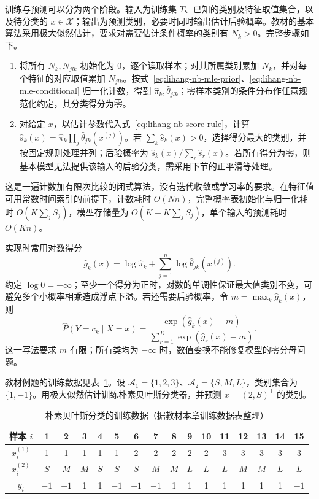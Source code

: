 训练与预测可以分为两个阶段。输入为训练集 $T$、已知的类别及特征取值集合，以及待分类的 $x\in\mathcal{X}$；输出为预测类别，必要时同时输出估计后验概率。教材的基本算法采用极大似然估计，要求对需要估计条件概率的类别有 $N_k>0$。完整步骤如下。
\begin{enumerate}
    \item 将所有 $N_k,N_{jlk}$ 初始化为 $0$，逐个读取样本；对其所属类别累加 $N_k$，并对每个特征的对应取值累加 $N_{jlk}$。按式~\eqref{eq:lihang-nb-mle-prior}、\eqref{eq:lihang-nb-mle-conditional} 归一化计数，得到 $\widehat\pi_k,\widehat\theta_{jlk}$；零样本类别的条件分布作任意规范化约定，其分类得分为零。
    \item 对给定 $x$，以估计参数代入式~\eqref{eq:lihang-nb-score-rule}，计算 $\widehat s_k(x)=\widehat\pi_k\prod_j\widehat\theta_{jk}(x^{(j)})$。若 $\sum_k\widehat s_k(x)>0$，选择得分最大的类别，并按固定规则处理并列；后验概率为 $\widehat s_k(x)/\sum_r\widehat s_r(x)$。若所有得分为零，则基本模型无法提供该输入的后验分类，需采用下节的正平滑等处理。
\end{enumerate}
这是一遍计数加有限次比较的闭式算法，没有迭代收敛或学习率的要求。在特征值可用常数时间索引的前提下，计数耗时 $O(Nn)$，完整概率表初始化与归一化耗时 $O(K\sum_j S_j)$，模型存储量为 $O(K+K\sum_j S_j)$，单个输入的预测耗时 $O(Kn)$。

实现时常用对数得分
\begin{equation}
\label{eq:lihang-nb-log-score}
    \widehat g_k(x)=\log\widehat\pi_k+
    \sum_{j=1}^{n}\log\widehat\theta_{jk}(x^{(j)}).
\end{equation}
约定 $\log0=-\infty$；至少一个得分为正时，对数的单调性保证最大值类别不变，可避免多个小概率相乘造成浮点下溢。若还需要后验概率，令 $m=\max_k\widehat g_k(x)$，则
\[
    \widehat P(Y=c_k\mid X=x)
    =\frac{\exp(\widehat g_k(x)-m)}{\sum_{r=1}^{K}\exp(\widehat g_r(x)-m)}.
\]
这一写法要求 $m$ 有限；所有类均为 $-\infty$ 时，数值变换不能修复模型的零分母问题。

\begin{example}
\label{ex:lihang-nb-mle-classification}
教材例题的训练数据见表~\ref{tab:lihang-nb-training}。设 $\mathcal{A}_1=\{1,2,3\}$、$\mathcal{A}_2=\{S,M,L\}$，类别集合为 $\{1,-1\}$。用极大似然估计训练朴素贝叶斯分类器，并预测 $x=(2,S)^{\mathsf T}$ 的类别。
\end{example}

\begin{table}[htbp]
\centering
\caption{朴素贝叶斯分类的训练数据（据教材本章训练数据表整理）}
\label{tab:lihang-nb-training}
\begin{tabular}{c|ccccccccccccccc}
\toprule
样本 $i$ & 1 & 2 & 3 & 4 & 5 & 6 & 7 & 8 & 9 & 10 & 11 & 12 & 13 & 14 & 15 \\
\midrule
$x_i^{(1)}$ & 1 & 1 & 1 & 1 & 1 & 2 & 2 & 2 & 2 & 2 & 3 & 3 & 3 & 3 & 3 \\
$x_i^{(2)}$ & $S$ & $M$ & $M$ & $S$ & $S$ & $S$ & $M$ & $M$ & $L$ & $L$ & $L$ & $M$ & $M$ & $L$ & $L$ \\
$y_i$ & $-1$ & $-1$ & 1 & 1 & $-1$ & $-1$ & $-1$ & 1 & 1 & 1 & 1 & 1 & 1 & 1 & $-1$ \\
\bottomrule
\end{tabular}
\end{table}

